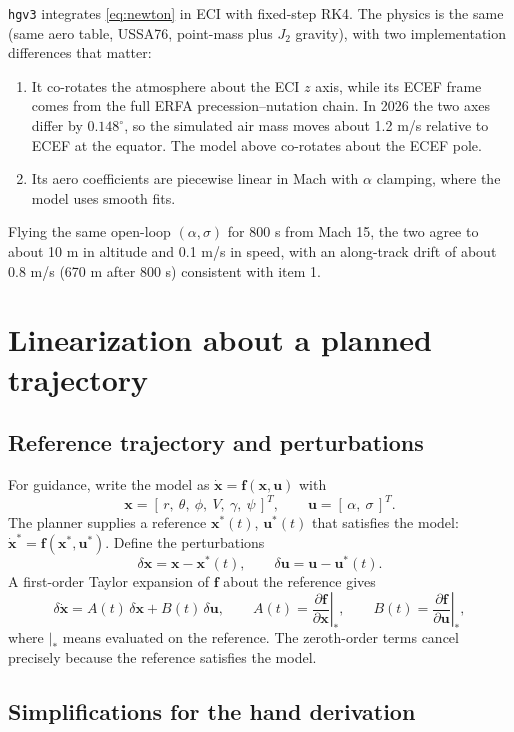 \documentclass[11pt]{report}
\numberwithin{equation}{chapter}
\newcommand{\vb}[1]{\bm{#1}}
\newcommand{\pd}[2]{\frac{\partial #1}{\partial #2}}
\newcommand{\code}[1]{\texttt{#1}}
\begin{document}
\code{hgv3} integrates \cref{eq:newton} in ECI with fixed-step RK4. The physics is the same
(same aero table, USSA76, point-mass plus $J_2$ gravity), with two implementation
differences that matter:
\begin{enumerate}
\item It co-rotates the atmosphere about the ECI $z$ axis, while its ECEF frame comes from
  the full ERFA precession--nutation chain. In 2026 the two axes differ by $0.148^\circ$,
  so the simulated air mass moves about 1.2 m/s relative to ECEF at the equator. The
  model above co-rotates about the ECEF pole.
\item Its aero coefficients are piecewise linear in Mach with $\alpha$ clamping, where the
  model uses smooth fits.
\end{enumerate}
Flying the same open-loop $(\alpha,\sigma)$ for 800 s from Mach 15, the two agree to about
10 m in altitude and 0.1 m/s in speed, with an along-track drift of about 0.8 m/s
(670 m after 800 s) consistent with item 1.

\chapter{Linearization about a planned trajectory}\label{ch:lin}

\section{Reference trajectory and perturbations}

For guidance, write the model as $\dot{\vb x} = \vb f(\vb x,\vb u)$ with
\[
  \vb x = [\,r,\ \theta,\ \phi,\ V,\ \gamma,\ \psi\,]^T,\qquad
  \vb u = [\,\alpha,\ \sigma\,]^T .
\]
The planner supplies a reference $\vb x^*(t)$, $\vb u^*(t)$ that satisfies the model:
$\dot{\vb x}^* = \vb f(\vb x^*,\vb u^*)$. Define the perturbations
\[
  \delta\vb x = \vb x - \vb x^*(t),\qquad \delta\vb u = \vb u - \vb u^*(t).
\]
A first-order Taylor expansion of $\vb f$ about the reference gives
\begin{equation}
  \delta\dot{\vb x} = A(t)\,\delta\vb x + B(t)\,\delta\vb u,\qquad
  A(t) = \left.\pd{\vb f}{\vb x}\right|_{*},\qquad
  B(t) = \left.\pd{\vb f}{\vb u}\right|_{*},
\end{equation}
where $|_*$ means evaluated on the reference. The zeroth-order terms cancel precisely because
the reference satisfies the model.

\section{Simplifications for the hand derivation}\label{sec:simplify}
\end{document}
